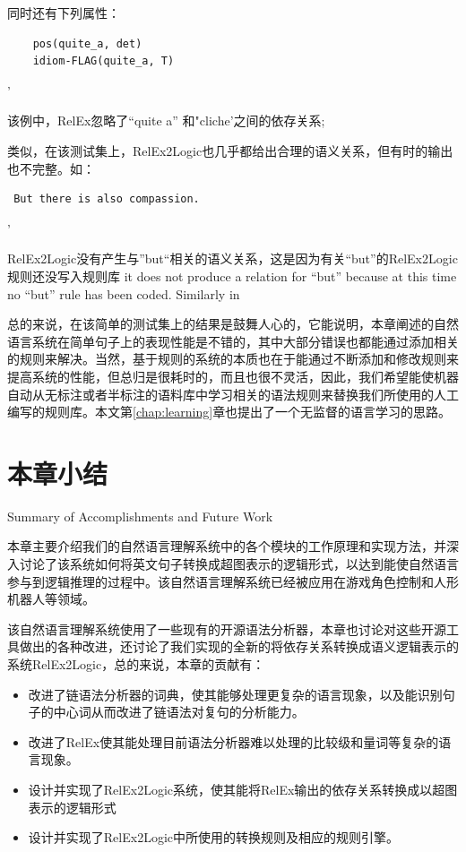 同时还有下列属性：

 \begin{verbatim}
    pos(quite_a, det)
    idiom-FLAG(quite_a, T)
   \end{verbatim}'
     
\noindent 该例中，RelEx忽略了``quite a'' 和"cliche'之间的依存关系;

 类似，在该测试集上，RelEx2Logic也几乎都给出合理的语义关系，但有时的输出也不完整。如：

  \begin{verbatim}
 But there is also compassion. 
    \end{verbatim}'
 
 \noindent RelEx2Logic没有产生与”but“相关的语义关系，这是因为有关“but”的RelEx2Logic规则还没写入规则库
it does not produce a relation for ``but'' because at this time no ``but'' rule has been coded.   Similarly in
 
总的来说，在该简单的测试集上的结果是鼓舞人心的，它能说明，本章阐述的自然语言系统在简单句子上的表现性能是不错的，其中大部分错误也都能通过添加相关的规则来解决。当然，基于规则的系统的本质也在于能通过不断添加和修改规则来提高系统的性能，但总归是很耗时的，而且也很不灵活，因此，我们希望能使机器自动从无标注或者半标注的语料库中学习相关的语法规则来替换我们所使用的人工编写的规则库。本文第\ref{chap:learning}章也提出了一个无监督的语言学习的思路。

\section{本章小结}{Summary of Accomplishments and Future Work}

本章主要介绍我们的自然语言理解系统中的各个模块的工作原理和实现方法，并深入讨论了该系统如何将英文句子转换成超图表示的逻辑形式，以达到能使自然语言参与到逻辑推理的过程中。该自然语言理解系统已经被应用在游戏角色控制和人形机器人等领域。

该自然语言理解系统使用了一些现有的开源语法分析器，本章也讨论对这些开源工具做出的各种改进，还讨论了我们实现的全新的将依存关系转换成语义逻辑表示的系统RelEx2Logic，总的来说，本章的贡献有：

\begin{itemize}
\item 改进了链语法分析器的词典，使其能够处理更复杂的语言现象，以及能识别句子的中心词从而改进了链语法对复句的分析能力。
\item 改进了RelEx使其能处理目前语法分析器难以处理的比较级和量词等复杂的语言现象。
\item 设计并实现了RelEx2Logic系统，使其能将RelEx输出的依存关系转换成以超图表示的逻辑形式
\item 设计并实现了RelEx2Logic中所使用的转换规则及相应的规则引擎。
\end{itemize}

